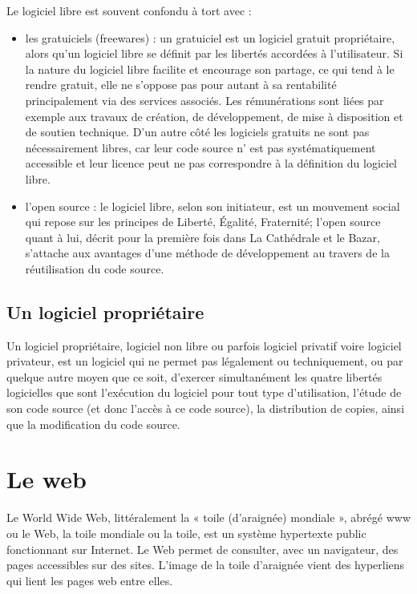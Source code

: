 Le logiciel libre est souvent confondu à tort avec :
\begin{itemize}
    \item les gratuiciels (freewares) : un gratuiciel est un logiciel gratuit propriétaire,
    alors qu'un logiciel libre se définit par les libertés accordées à l'utilisateur.
    Si la nature du logiciel libre facilite et encourage son partage, ce qui tend à
    le rendre gratuit, elle ne s'oppose pas pour autant à sa rentabilité principalement
    via des services associés. Les rémunérations sont liées par exemple aux travaux de
    création, de développement, de mise à disposition et de soutien technique. D'un autre
    côté les logiciels gratuits ne sont pas nécessairement libres, car leur code source n'
    est pas systématiquement accessible et leur licence peut ne pas correspondre à la
    définition du logiciel libre.
    \item l’open source : le logiciel libre, selon son initiateur, est un mouvement social qui
    repose sur les principes de Liberté, Égalité, Fraternité; l’open source quant à lui,
    décrit pour la première fois dans La Cathédrale et le Bazar, s'attache aux avantages
    d'une méthode de développement au travers de la réutilisation du code source.
\end{itemize}

\subsection{Un logiciel propriétaire}\label{subsec:logiciel-proprietaire}
Un logiciel propriétaire\cite{logiciel_proprietaire}, logiciel non libre ou parfois logiciel privatif voire logiciel privateur,
est un logiciel qui ne permet pas légalement ou techniquement, ou par quelque autre moyen que ce soit,
d'exercer simultanément les quatre libertés logicielles que sont l'exécution du logiciel pour tout type
d'utilisation, l'étude de son code source (et donc l'accès à ce code source), la distribution de copies,
ainsi que la modification du code source.

\section{Le web}\label{subsec:web}
Le World Wide Web\cite{world_wide_web}, littéralement la « toile (d’araignée) mondiale », abrégé www ou le Web, la toile mondiale ou la toile,
est un système hypertexte public fonctionnant sur Internet. Le Web permet de consulter,
avec un navigateur, des pages accessibles sur des sites. L’image de la toile d’araignée vient
des hyperliens qui lient les pages web entre elles.

